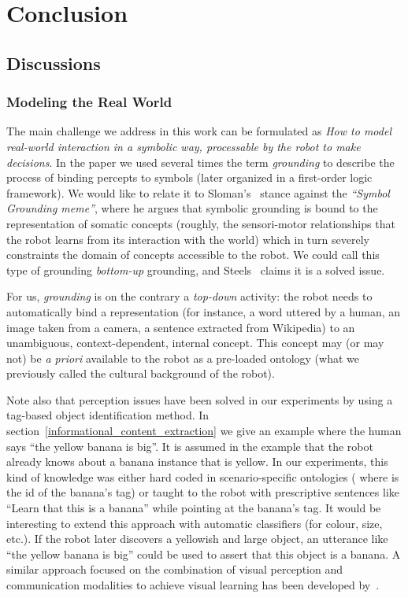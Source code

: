 \chapter{Conclusion}
\label{chapter|conclusion}

\section{Discussions}
\label{sect|discussion}

\subsection{Modeling the Real World}
\label{modeling_real_world}

The main challenge we address in this work can be formulated as \emph{How to
model real-world interaction in a symbolic way, processable by the robot to
make decisions}. In the paper we used several times the term \emph{grounding} to
describe the process of binding percepts to symbols (later organized in a
first-order logic framework).  We would like to relate it to
Sloman's~\cite{Sloman2007} stance against the \emph{``Symbol Grounding meme''},
where he argues that symbolic grounding is bound to the representation of
somatic concepts (\ie roughly, the sensori-motor relationships that the robot
learns from its interaction with the world) which in turn severely constraints
the domain of concepts accessible to the robot. We could call this type of
grounding \emph{bottom-up} grounding, and Steels~\cite{Steels2007} claims it is
a solved issue.

For us, \emph{grounding} is on the contrary a \emph{top-down} activity: the
robot needs to automatically bind a representation (for instance, a word
uttered by a human, an image taken from a camera, a sentence extracted from
Wikipedia) to an unambiguous, context-dependent, internal concept. This 
concept may (or may not) be \textit{a priori} available to the robot as a
pre-loaded ontology (what we previously called the cultural background of the
robot).

Note also that perception issues have been solved in our experiments by using a
tag-based object identification method. In
section~\ref{informational_content_extraction} we give an example where the
human says ``the yellow banana is big''. It is assumed in the example that the
robot already knows about a banana instance that is yellow. In our experiments,
this kind of knowledge was either hard coded in scenario-specific ontologies
(\eg {} where  is the id of the
banana's tag) or taught to the robot with prescriptive sentences like ``Learn
that this is a banana'' while pointing at the banana's tag. It would be
interesting to extend this approach with automatic classifiers (for colour,
size, etc.). If the robot later discovers a yellowish and large object, an
utterance like ``the yellow banana is big'' could be used to assert that this
object is a banana.  A similar approach focused on the combination of visual
perception and communication modalities to achieve visual learning has been
developed by~\cite{Vrecko2009}.

